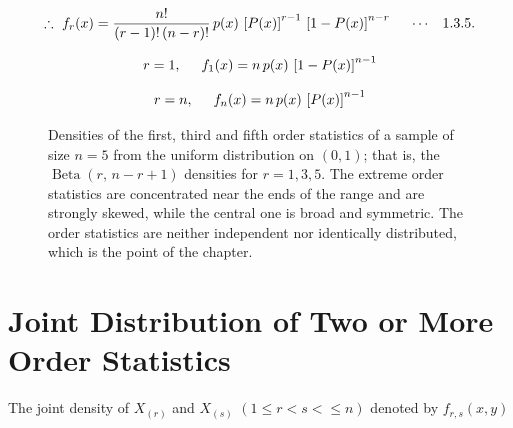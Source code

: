 \documentclass[12pt,a4paper]{report}
\theoremstyle{definition}
\theoremstyle{plain}
\begin{document}
$$\therefore\,\, f_r(x) = \frac{n!}{(r - 1)!\, (n - r)!}\, p(x)\, \left[P(x)\right]^{r - 1}\, \left[1 - P(x)\right]^{n - r}\hspace{0.5cm}\cdots\hspace{0.3cm} 1.3.5.$$

$$r = 1, \hspace{0.5cm} f_1(x) = n\, p(x)\, \left[1 - P(x)\right]^{n - 1}$$

$$r = n, \hspace{0.5cm} f_n(x) = n\, p(x)\, \left[P(x)\right]^{n - 1}$$






\begin{figure}[H]
\centering
{}
\caption{Densities of the first, third and fifth order statistics of a sample of
size $n=5$ from the uniform distribution on $(0,1)$; that is, the
$\operatorname{Beta}(r,\,n-r+1)$ densities for $r=1,3,5$. The extreme order
statistics are concentrated near the ends of the range and are strongly skewed,
while the central one is broad and symmetric. The order statistics are neither
independent nor identically distributed, which is the point of the chapter.}
\label{fig:orderdens}
\end{figure}

\section{Joint Distribution of Two or More Order Statistics}
The joint density of $X_{(r)}$ and $X_{(s)}\,\, \left(1\leq r < s < \leq n\right)$ denoted by $f_{r,s}(x,y)$
\end{document}
